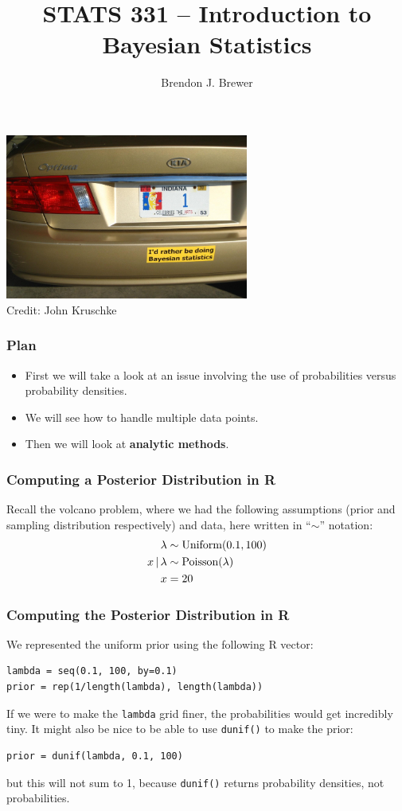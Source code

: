 \documentclass{beamer}
\author{Brendon J. Brewer}
\title{STATS 331 -- Introduction to Bayesian Statistics}
\institute{The University of Auckland}
\date{}
\newcommand{\given}{\,|\,}
\begin{document}
\frame{\titlepage}

\begin{frame}
\begin{center}
\includegraphics[width=0.6\textwidth]{images/bumper_sticker.png} \\
Credit: John Kruschke
\end{center}

\end{frame}


\begin{frame}
\frametitle{Plan}
\begin{itemize}
\item First we will take a look at an issue involving the use of
probabilities versus probability densities.\pause
\item We will see how to handle multiple data points.\pause
\item Then we will look at {\bf analytic methods}.
\end{itemize}

\end{frame}


\begin{frame}
\frametitle{Computing a Posterior Distribution in R}
Recall the volcano problem, where we had the following assumptions
(prior and sampling distribution respectively) and data,
here written in ``$\sim$'' notation:
\begin{align}
\lambda &\sim \textnormal{Uniform}(0.1, 100) \\
x \given \lambda &\sim \textnormal{Poisson}(\lambda) \\
x &= 20
\end{align}


\end{frame}

\begin{frame}[fragile]
\frametitle{Computing the Posterior Distribution in R}
We represented the uniform prior using the following R vector:
\begin{verbatim}
lambda = seq(0.1, 100, by=0.1)
prior = rep(1/length(lambda), length(lambda))
\end{verbatim}
\pause

If we were to make the \texttt{lambda} grid finer, the probabilities
would get incredibly tiny. It might also be nice to be able to use
\texttt{dunif()} to make the prior:
\begin{verbatim}
prior = dunif(lambda, 0.1, 100)
\end{verbatim}
but this will not sum to 1, because \texttt{dunif()} returns
probability densities, not probabilities.


\end{frame}
\end{document}
